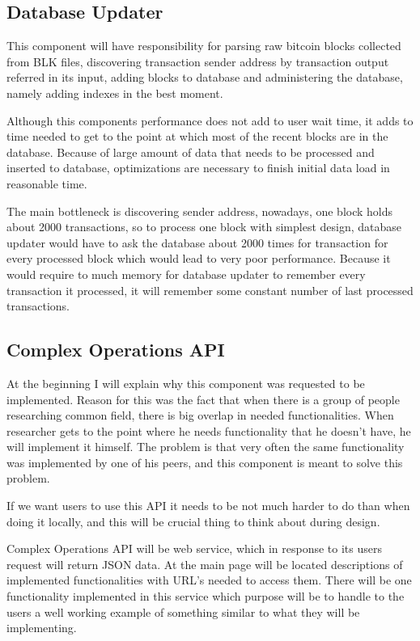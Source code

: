 \documentclass[12pt, en, eng, oneside]{mgr}
\begin{document}
\subsection{Database Updater}
This component will have responsibility for parsing raw bitcoin blocks collected from BLK files, discovering transaction sender address by transaction output referred in its input, adding blocks to database and administering the database, namely adding indexes in the best moment.

Although this components performance does not add to user wait time, it adds to time needed to get to the point at which most of the recent blocks are in the database. Because of large amount of data that needs to be processed and inserted to database, optimizations are necessary to finish initial data load in reasonable time.

The main bottleneck is discovering sender address, nowadays, one block holds about 2000 transactions, so to process one block with simplest design, database updater would have to ask the database about 2000 times for transaction for every processed block which would lead to very poor performance. Because it would require to much memory for database updater to remember every transaction it processed, it will remember some constant number of last processed transactions.

\subsection{Complex Operations API}
At the beginning I will explain why this component was requested to be implemented. Reason for this was the fact that when there is a group of people researching common field, there is big overlap in needed functionalities. When researcher gets to the point where he needs functionality that he doesn't have, he will implement it himself. The problem is that very often the same functionality was implemented by one of his peers, and this component is meant to solve this problem. 

If we want users to use this API it needs to be not much harder to do than when doing it locally, and this will be crucial thing to think about during design.

Complex Operations API will be web service, which in response to its users request will return JSON data. At the main page will be located descriptions of implemented functionalities with URL's needed to access them. There will be one functionality implemented in this service which purpose will be to handle to the users a well working example of something similar to what they will be implementing.   
\end{document}
